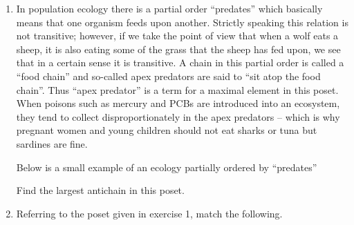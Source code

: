 \begin{enumerate}
\item In population ecology there is a partial order ``predates''
which basically means that one organism feeds upon another.  Strictly
speaking this relation is not transitive; however, if we take the point
of view that when a wolf eats a sheep, it is also eating some of the grass
that the sheep has fed upon, we see that in a certain sense it is transitive.
A chain in this partial order is called a ``food chain'' and so-called 
apex predators are said to ``sit atop the food chain''.  Thus ``apex 
predator'' is a term for a maximal element in this poset.   When poisons
such as mercury and PCBs are introduced into an ecosystem, they tend to
collect disproportionately in the apex predators -- which is why pregnant
women and young children should not eat sharks or tuna but sardines 
are fine.

Below is a small example of an ecology partially ordered by ``predates''

\begin{center}

\end{center}

Find the largest antichain in this poset.

\newpage

\item Referring to the poset given in exercise 1, match the following.


\end{enumerate}
